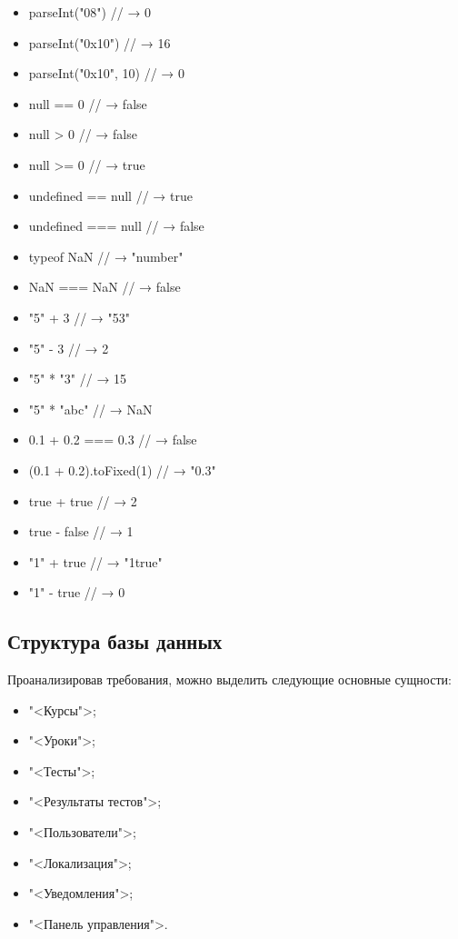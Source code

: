 \begin{itemize}
  \item parseInt("08") // → 0
  \item parseInt("0x10") // → 16
  \item parseInt("0x10", 10) // → 0
  \item null == 0 // → false
  \item null > 0 // → false
  \item null >= 0 // → true
  \item undefined == null // → true
  \item undefined === null // → false
  \item typeof NaN // → "number"
  \item NaN === NaN // → false
  \item "5" + 3 // → "53"
  \item "5" - 3 // → 2
  \item "5" * "3" // → 15
  \item "5" * "abc" // → NaN
  \item 0.1 + 0.2 === 0.3 // → false
  \item (0.1 + 0.2).toFixed(1) // → "0.3"
  \item true + true // → 2
  \item true - false // → 1
  \item "1" + true // → "1true"
  \item "1" - true // → 0
\end{itemize}



\subsection{Структура базы данных}

Проанализировав требования, можно выделить следующие основные сущности:

\begin{itemize}
	\item "<Курсы">;
	\item "<Уроки">;
	\item "<Тесты">;
	\item "<Результаты тестов">;
	\item "<Пользователи">;
	\item "<Локализация">;
	\item "<Уведомления">;
	\item "<Панель управления">.
\end{itemize}

